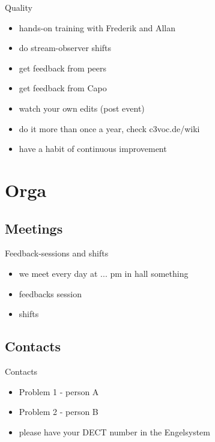 \documentclass[hyperref={pdfpagelabels=false}]{beamer}
\begin{document}
\begin{frame}{Quality}
\begin{itemize} %
\item  hands-on training with Frederik and Allan %
\item do stream-observer shifts %
\item  get feedback from peers %
\item  get feedback from Capo %
\item  watch your own edits (post event) %
\item  do it more than once a year, check c3voc.de/wiki %
\item  have a habit of continuous improvement %
\end{itemize} 
\end{frame}

\section{Orga} 
\subsection{Meetings}
\begin{frame}{Feedback-sessions and shifts}
\begin{itemize}
\item  we meet every day at ... pm in hall something
\item  feedbacks session
\item  shifts
\end{itemize} 
\end{frame}

\subsection{Contacts}
\begin{frame}{Contacts}
\begin{itemize}
\item  Problem 1 - person A
\item  Problem 2 - person B
\item  please have your DECT number in the Engelsystem
\end{itemize} 
\end{frame}

\end{document}
